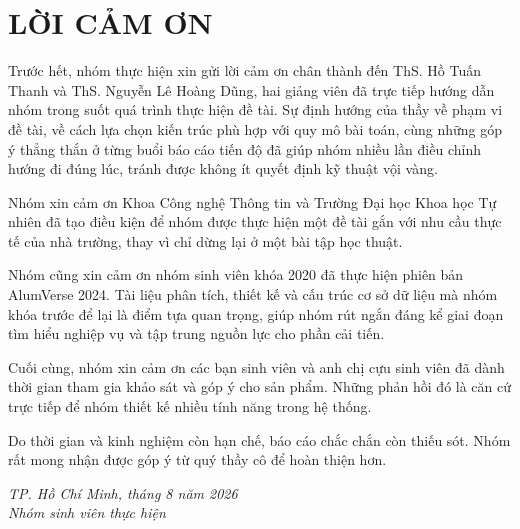\documentclass[12pt,a4paper,oneside]{report}
\begin{document}
\chapter*{LỜI CẢM ƠN}

Trước hết, nhóm thực hiện xin gửi lời cảm ơn chân thành đến ThS. Hồ Tuấn Thanh và ThS. Nguyễn Lê Hoàng Dũng, hai giảng viên đã trực tiếp hướng dẫn nhóm trong suốt quá trình thực hiện đề tài. Sự định hướng của thầy về phạm vi đề tài, về cách lựa chọn kiến trúc phù hợp với quy mô bài toán, cùng những góp ý thẳng thắn ở từng buổi báo cáo tiến độ đã giúp nhóm nhiều lần điều chỉnh hướng đi đúng lúc, tránh được không ít quyết định kỹ thuật vội vàng.

Nhóm xin cảm ơn Khoa Công nghệ Thông tin và Trường Đại học Khoa học Tự nhiên đã tạo điều kiện để nhóm được thực hiện một đề tài gắn với nhu cầu thực tế của nhà trường, thay vì chỉ dừng lại ở một bài tập học thuật.

Nhóm cũng xin cảm ơn nhóm sinh viên khóa 2020 đã thực hiện phiên bản AlumVerse 2024. Tài liệu phân tích, thiết kế và cấu trúc cơ sở dữ liệu mà nhóm khóa trước để lại là điểm tựa quan trọng, giúp nhóm rút ngắn đáng kể giai đoạn tìm hiểu nghiệp vụ và tập trung nguồn lực cho phần cải tiến.

Cuối cùng, nhóm xin cảm ơn các bạn sinh viên và anh chị cựu sinh viên đã dành thời gian tham gia khảo sát và góp ý cho sản phẩm. Những phản hồi đó là căn cứ trực tiếp để nhóm thiết kế nhiều tính năng trong hệ thống.

Do thời gian và kinh nghiệm còn hạn chế, báo cáo chắc chắn còn thiếu sót. Nhóm rất mong nhận được góp ý từ quý thầy cô để hoàn thiện hơn.

\vspace{0.8cm}
\begin{flushright}
\textit{TP. Hồ Chí Minh, tháng 8 năm 2026}\\[4pt]
\textit{Nhóm sinh viên thực hiện}
\end{flushright}

\newpage
\renewcommand{\cfttoctitlefont}{\hfill\fontsize{14}{18}\selectfont\bfseries}
\renewcommand{\cftaftertoctitle}{\hfill}
\renewcommand{\cftloftitlefont}{\hfill\fontsize{14}{18}\selectfont\bfseries}
\renewcommand{\cftafterloftitle}{\hfill}
\renewcommand{\cftlottitlefont}{\hfill\fontsize{14}{18}\selectfont\bfseries}
\renewcommand{\cftafterlottitle}{\hfill}
\tableofcontents

\newpage
\listoffigures
{}
\end{document}
